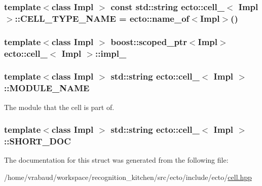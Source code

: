 \subsubsection[{C\+E\+L\+L\+\_\+\+T\+Y\+P\+E\+\_\+\+N\+A\+M\+E}]{\setlength{\rightskip}{0pt plus 5cm}template$<$class Impl $>$ const std\+::string {\bf ecto\+::cell\+\_\+}$<$ Impl $>$\+::C\+E\+L\+L\+\_\+\+T\+Y\+P\+E\+\_\+\+N\+A\+M\+E = {\bf ecto\+::name\+\_\+of}$<$Impl$>$()\hspace{0.3cm}{\ttfamily [static]}}\label{structecto_1_1cell___a26e158738e4e4c8f0ddb64efce30d8d3}
\hypertarget{structecto_1_1cell___a2984b78c1ed24aca6ee427502bd6e8c4}{}
\subsubsection[{impl\+\_\+}]{\setlength{\rightskip}{0pt plus 5cm}template$<$class Impl $>$ boost\+::scoped\+\_\+ptr$<$Impl$>$ {\bf ecto\+::cell\+\_\+}$<$ Impl $>$\+::impl\+\_\+\hspace{0.3cm}{\ttfamily [private]}}\label{structecto_1_1cell___a2984b78c1ed24aca6ee427502bd6e8c4}
\hypertarget{structecto_1_1cell___ab81cf6649132223f620b739a57db04db}{}
\subsubsection[{M\+O\+D\+U\+L\+E\+\_\+\+N\+A\+M\+E}]{\setlength{\rightskip}{0pt plus 5cm}template$<$class Impl $>$ std\+::string {\bf ecto\+::cell\+\_\+}$<$ Impl $>$\+::M\+O\+D\+U\+L\+E\+\_\+\+N\+A\+M\+E\hspace{0.3cm}{\ttfamily [static]}}\label{structecto_1_1cell___ab81cf6649132223f620b739a57db04db}


The module that the cell is part of. 

\hypertarget{structecto_1_1cell___a6a5b6bd083a48acd35ffcf83dacff2f1}{}
\subsubsection[{S\+H\+O\+R\+T\+\_\+\+D\+O\+C}]{\setlength{\rightskip}{0pt plus 5cm}template$<$class Impl $>$ std\+::string {\bf ecto\+::cell\+\_\+}$<$ Impl $>$\+::S\+H\+O\+R\+T\+\_\+\+D\+O\+C\hspace{0.3cm}{\ttfamily [static]}}\label{structecto_1_1cell___a6a5b6bd083a48acd35ffcf83dacff2f1}


The documentation for this struct was generated from the following file\+:\begin{DoxyCompactItemize}
\item 
/home/vrabaud/workspace/recognition\+\_\+kitchen/src/ecto/include/ecto/\hyperlink{cell_8hpp}{cell.\+hpp}\end{DoxyCompactItemize}
